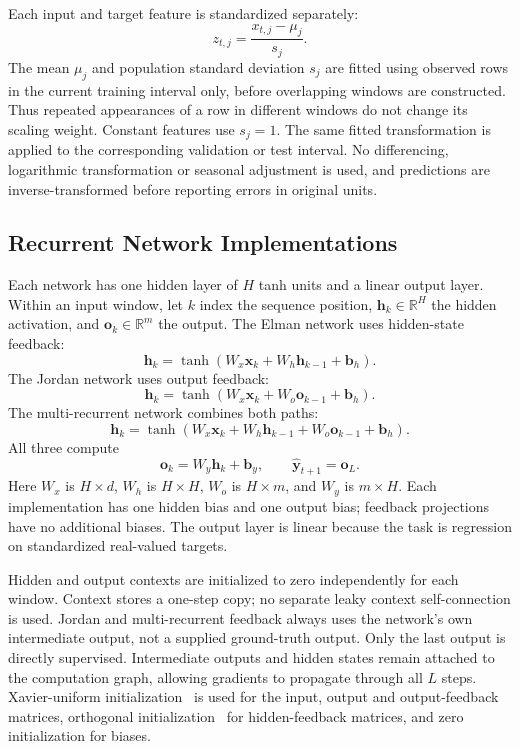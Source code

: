 Each input and target feature is standardized separately:
\begin{equation}
 z_{t,j}=\frac{x_{t,j}-\mu_j}{s_j}.
\end{equation}
The mean $\mu_j$ and population standard deviation $s_j$ are fitted using
observed rows in the current training interval only, before overlapping windows
are constructed. Thus repeated appearances of a row in different windows do not
change its scaling weight. Constant features use $s_j=1$. The same fitted
transformation is applied to the corresponding validation or test interval. No
differencing, logarithmic transformation or seasonal adjustment is used, and
predictions are inverse-transformed before reporting errors in original units.

\subsection{Recurrent Network Implementations}
Each network has one hidden layer of $H$ tanh units and a linear output layer.
Within an input window, let $k$ index the sequence position,
$\mathbf{h}_k\in\mathbb{R}^{H}$ the hidden activation, and
$\mathbf{o}_k\in\mathbb{R}^{m}$ the output. The Elman network uses hidden-state
feedback:
\begin{equation}
 \mathbf{h}_k=\tanh(W_x\mathbf{x}_k+W_h\mathbf{h}_{k-1}+\mathbf{b}_h).
\end{equation}
The Jordan network uses output feedback:
\begin{equation}
 \mathbf{h}_k=\tanh(W_x\mathbf{x}_k+W_o\mathbf{o}_{k-1}+\mathbf{b}_h).
\end{equation}
The multi-recurrent network combines both paths:
\begin{equation}
 \mathbf{h}_k=\tanh(W_x\mathbf{x}_k+W_h\mathbf{h}_{k-1}
                         +W_o\mathbf{o}_{k-1}+\mathbf{b}_h).
\end{equation}
All three compute
\begin{equation}
 \mathbf{o}_k=W_y\mathbf{h}_k+\mathbf{b}_y,
 \qquad \hat{\mathbf{y}}_{t+1}=\mathbf{o}_L.
\end{equation}
Here $W_x$ is $H\times d$, $W_h$ is $H\times H$, $W_o$ is $H\times m$, and
$W_y$ is $m\times H$. Each implementation has one hidden bias and one output
bias; feedback projections have no additional biases. The output layer is linear
because the task is regression on standardized real-valued targets.

Hidden and output contexts are initialized to zero independently for each window.
Context stores a one-step copy; no separate leaky context self-connection is
used. Jordan and multi-recurrent feedback always uses the network's own
intermediate output, not a supplied ground-truth output. Only the last output is
directly supervised. Intermediate outputs and hidden states remain attached to
the computation graph, allowing gradients to propagate through all $L$ steps.
Xavier-uniform initialization~\cite{pmlr-v9-glorot10a} is used for the input,
output and output-feedback matrices, orthogonal initialization~\cite{saxe2014exactsolutionsnonlineardynamics}
for hidden-feedback matrices, and zero initialization for biases.


